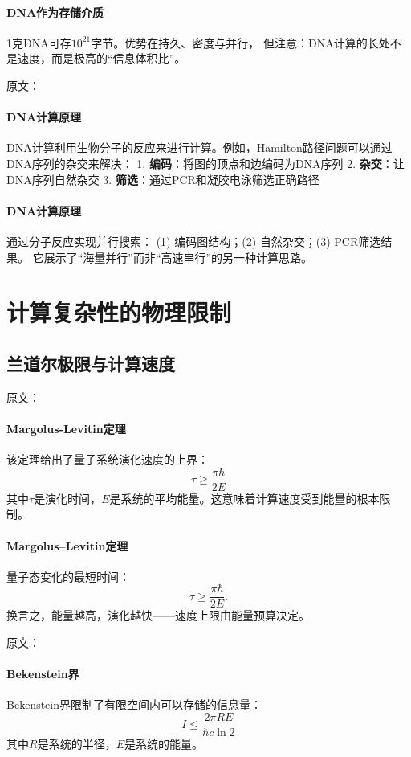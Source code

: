 \paragraph{DNA作为存储介质}
1克DNA可存$10^{21}$字节。\;优势在持久、密度与并行，  
但注意：DNA计算的长处不是速度，而是极高的“信息体积比”。

原文：
\paragraph{DNA计算原理}
DNA计算利用生物分子的反应来进行计算。例如，Hamilton路径问题可以通过DNA序列的杂交来解决：
1. \textbf{编码}：将图的顶点和边编码为DNA序列
2. \textbf{杂交}：让DNA序列自然杂交
3. \textbf{筛选}：通过PCR和凝胶电泳筛选正确路径
\paragraph{DNA计算原理}
通过分子反应实现并行搜索：  
(1) 编码图结构；(2) 自然杂交；(3) PCR筛选结果。  
它展示了“海量并行”而非“高速串行”的另一种计算思路。

\section{计算复杂性的物理限制}

\subsection{兰道尔极限与计算速度}

原文：
\paragraph{Margolus-Levitin定理}
该定理给出了量子系统演化速度的上界：
$$\tau \geq \frac{\pi \hbar}{2E}$$
其中$\tau$是演化时间，$E$是系统的平均能量。这意味着计算速度受到能量的根本限制。
\paragraph{Margolus–Levitin定理}
量子态变化的最短时间：
$$\tau\ge\dfrac{\pi\hbar}{2E}.$$
换言之，能量越高，演化越快——\;速度上限由能量预算决定。

原文：
\paragraph{Bekenstein界}
Bekenstein界限制了有限空间内可以存储的信息量：
$$I \leq \frac{2\pi R E}{\hbar c \ln 2}$$
其中$R$是系统的半径，$E$是系统的能量。
